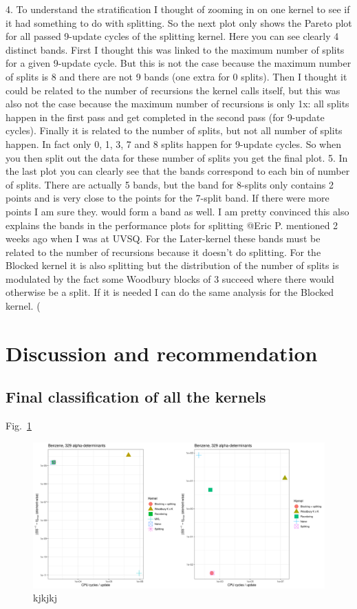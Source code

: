 \documentclass[11pt]{article}
\numberwithin{figure}{section}
\numberwithin{table}{section}
\begin{document}
4. To understand the stratification I thought of zooming in on one kernel to see if it had something to do with splitting. So the next plot only shows the Pareto plot for all passed  9-update cycles of the splitting kernel. Here you can see clearly 4 distinct bands. First I thought this was linked to the maximum number of splits for a given 9-update cycle. But this is not the case because the maximum number of splits is 8 and there are not 9 bands (one extra for 0 splits). Then I thought it could be related to the number of recursions the kernel calls itself, but this was also not the case because the maximum number of recursions is only 1x: all splits happen in the first pass and get completed in the second pass (for 9-update cycles). Finally it is related to the number of splits, but not all number of splits happen. In fact only 0, 1, 3, 7 and 8 splits happen for 9-update cycles. So when you then split out the data for these number of splits you get the final plot.
5. In the last plot you can clearly see that the bands correspond to each bin of number of splits. There are actually 5 bands, but the band for 8-splits only contains 2 points and is very close to the points for the 7-split band. If there were more points I am sure they. would form a band as well. I am pretty convinced this also explains the bands in the performance plots for splitting 
@Eric P.
 mentioned 2 weeks ago when I was at UVSQ.
For the Later-kernel these bands must be related to the number of recursions because it doesn’t do splitting. For the Blocked kernel it is also splitting but the distribution of the number of splits is modulated by the fact some Woodbury blocks of 3 succeed where there would otherwise be a split. If it is needed I can do the same analysis for the Blocked kernel. (
			

  \section{Discussion and recommendation}
			\subsection{Final classification of all the kernels}
		
			Fig.~\ref{fig:Pareto_passfail_mean}
		
			\begin{figure}[h]
				\centering
				\includegraphics[width=1\textwidth]{Pareto_passfail_mean.png}
				\caption{kjkjkj}
				\label{fig:Pareto_passfail_mean}
			\end{figure}
	
\end{document}

